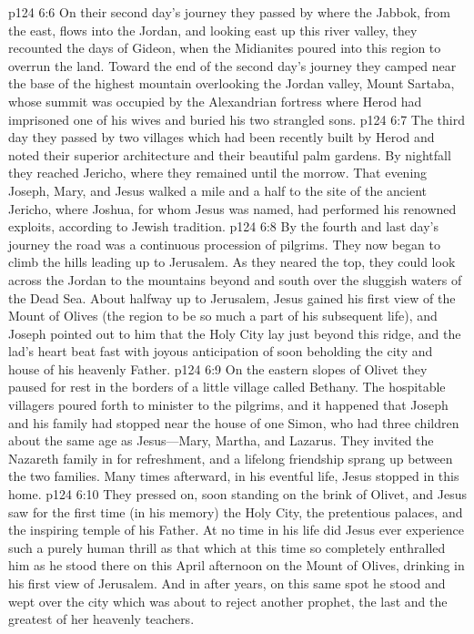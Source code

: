 \pc \vs p124 6:6 On their second day’s journey they passed by where the Jabbok, from the east, flows into the Jordan, and looking east up this river valley, they recounted the days of Gideon, when the Midianites poured into this region to overrun the land. Toward the end of the second day’s journey they camped near the base of the highest mountain overlooking the Jordan valley, Mount Sartaba, whose summit was occupied by the Alexandrian fortress where Herod had imprisoned one of his wives and buried his two strangled sons.
\vs p124 6:7 The third day they passed by two villages which had been recently built by Herod and noted their superior architecture and their beautiful palm gardens. By nightfall they reached Jericho, where they remained until the morrow. That evening Joseph, Mary, and Jesus walked a mile and a half to the site of the ancient Jericho, where Joshua, for whom Jesus was named, had performed his renowned exploits, according to Jewish tradition.
\vs p124 6:8 By the fourth and last day’s journey the road was a continuous procession of pilgrims. They now began to climb the hills leading up to Jerusalem. As they neared the top, they could look across the Jordan to the mountains beyond and south over the sluggish waters of the Dead Sea. About halfway up to Jerusalem, Jesus gained his first view of the Mount of Olives (the region to be so much a part of his subsequent life), and Joseph pointed out to him that the Holy City lay just beyond this ridge, and the lad’s heart beat fast with joyous anticipation of soon beholding the city and house of his heavenly Father.
\vs p124 6:9 On the eastern slopes of Olivet they paused for rest in the borders of a little village called Bethany. The hospitable villagers poured forth to minister to the pilgrims, and it happened that Joseph and his family had stopped near the house of one Simon, who had three children about the same age as Jesus---Mary, Martha, and Lazarus. They invited the Nazareth family in for refreshment, and a lifelong friendship sprang up between the two families. Many times afterward, in his eventful life, Jesus stopped in this home.
\vs p124 6:10 They pressed on, soon standing on the brink of Olivet, and Jesus saw for the first time (in his memory) the Holy City, the pretentious palaces, and the inspiring temple of his Father. At no time in his life did Jesus ever experience such a purely human thrill as that which at this time so completely enthralled him as he stood there on this April afternoon on the Mount of Olives, drinking in his first view of Jerusalem. And in after years, on this same spot he stood and wept over the city which was about to reject another prophet, the last and the greatest of her heavenly teachers.
